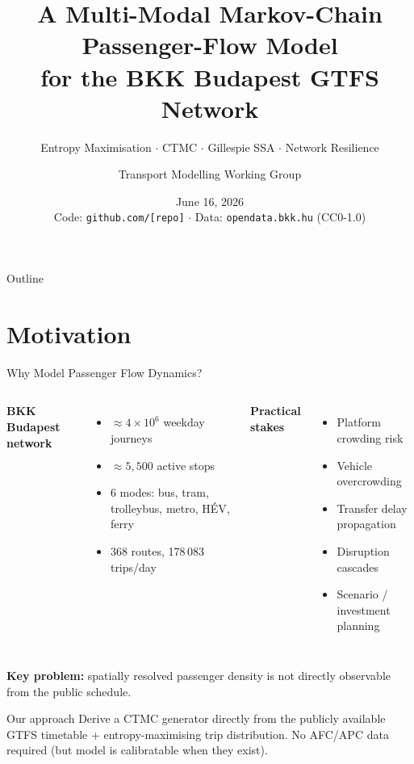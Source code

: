 \documentclass[aspectratio=169,12pt]{beamer}
\title[BKK Markov Flow]{A Multi-Modal Markov-Chain Passenger-Flow Model\\
       for the BKK Budapest GTFS Network}
\subtitle{Entropy Maximisation $\cdot$ CTMC $\cdot$ Gillespie SSA $\cdot$ Network Resilience}
\author{Transport Modelling Working Group}
\institute{[Institution Name]}
\date{June 16, 2026\\[4pt]
  \small Code: \texttt{github.com/[repo]} $\cdot$
        Data: \texttt{opendata.bkk.hu} (CC0-1.0)}
\begin{document}
\begin{frame}
\titlepage
\end{frame}

\begin{frame}{Outline}
\tableofcontents[hideallsubsections]
\end{frame}

\section{Motivation}
\begin{frame}{Why Model Passenger Flow Dynamics?}
\begin{columns}[T]
\textbf{BKK Budapest network}
\begin{itemize}
  \item $\approx 4\times10^6$ weekday journeys
  \item $\approx 5{,}500$ active stops
  \item 6 modes: bus, tram, trolleybus, metro, HÉV, ferry
  \item 368 routes, 178\,083 trips/day
\end{itemize}

\textbf{Practical stakes}
\begin{itemize}
  \item Platform crowding risk
  \item Vehicle overcrowding
  \item Transfer delay propagation
  \item Disruption cascades
  \item Scenario / investment planning
\end{itemize}
\end{columns}
\vspace{6pt}
\textbf{Key problem:} spatially resolved passenger density is not directly observable
from the public schedule.
\vspace{4pt}

\begin{block}{Our approach}
Derive a CTMC generator directly from the publicly available GTFS timetable +
entropy-maximising trip distribution.
No AFC/APC data required (but model is calibratable when they exist).
\end{block}
\end{frame}
\end{document}
